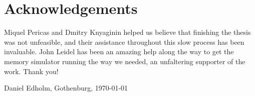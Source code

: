 \thispagestyle{plain}			%
\section*{Acknowledgements}
Miquel Pericas and Dmitry Knyaginin helped us believe that finishing the thesis was not unfeasible, and their assistance throughout this slow process has been invaluable. John Leidel has been an amazing help along the way to get the memory simulator running the way we needed, an unfaltering supporter of the work. Thank you!

\vspace{1.5cm}
\hfill
{}
Daniel Edholm, Gothenburg, \today
{}

\newpage				%
\thispagestyle{empty}
\mbox{}
